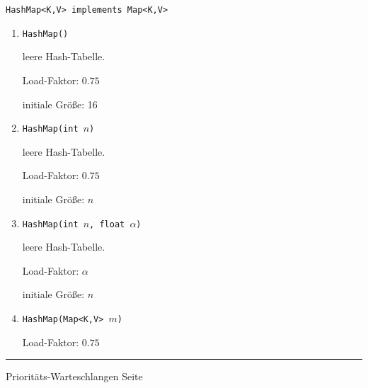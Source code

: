 \documentclass{slides}
\newcounter{mypage}
\begin{document}
\begin{slide}{}
\normalsize

\begin{center}
\texttt{HashMap<K,V> implements Map<K,V>}
\end{center}
\vspace*{0.5cm}

\footnotesize
\begin{enumerate}
\item \texttt{HashMap()}
  
      leere Hash-Tabelle.  

      Load-Faktor: $0.75$ 

      initiale Gr\"o{\ss}e: 16
\item \texttt{HashMap(int $n$)}
  
      leere Hash-Tabelle.  

      Load-Faktor: $0.75$ 

      initiale Gr\"o{\ss}e: $n$
\item \texttt{HashMap(int $n$, float $\alpha$)}

      leere Hash-Tabelle.  

      Load-Faktor: $\alpha$ 

      initiale Gr\"o{\ss}e: $n$
\item \texttt{HashMap(Map<K,V> $m$)}

      Load-Faktor: $0.75$ 
\end{enumerate}


\vspace*{\fill}
\tiny \addtocounter{mypage}{1}
\rule{17cm}{1mm}
Priorit\"ats-Warteschlangen \hspace*{\fill} Seite 
\end{slide}

\end{document}
